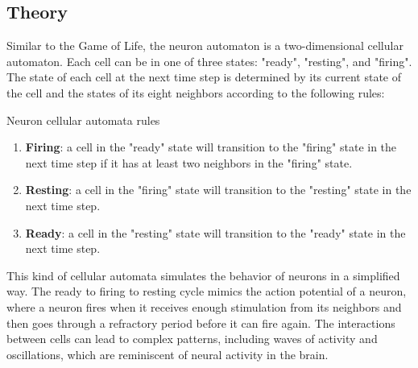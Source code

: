 \subsection{Theory}


Similar to the Game of Life, the neuron automaton is a two-dimensional cellular automaton. Each cell can be in one of three states: "ready", "resting", and "firing". The state of each cell at the next time step is determined by its current state of the cell and the states of its eight neighbors according to the following rules:

\begin{definitionbox}[label=neuronrules]{Neuron cellular automata rules}
\begin{enumerate}
\item \textbf{Firing}: a cell in the "ready" state will transition to the "firing" state in the next time step if it has at least two neighbors in the "firing" state.
\item \textbf{Resting}: a cell in the "firing" state will transition to the "resting" state in the next time step.
\item \textbf{Ready}: a cell in the "resting" state will transition to the "ready" state in the next time step.
\end{enumerate}
\end{definitionbox}

This kind of cellular automata simulates the behavior of neurons in a simplified way. The ready to firing to resting cycle mimics the action potential of a neuron, where a neuron fires when it receives enough stimulation from its neighbors and then goes through a refractory period before it can fire again. The interactions between cells can lead to complex patterns, including waves of activity and oscillations, which are reminiscent of neural activity in the brain.